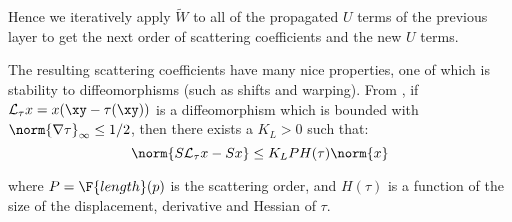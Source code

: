 Hence we iteratively apply $\tilde{W}$ to all of the propagated $U$ terms of
the previous layer to get the next order of scattering coefficients and
the new $U$ terms.

The resulting scattering coefficients have many nice properties, one of which is
stability to diffeomorphisms (such as shifts and warping). From
\cite{mallat_group_2012}, if $\mathcal{L}_\tau
x = x(\xy -\tau(\xy))$ is a diffeomorphism which is bounded with 
$\norm{\nabla \tau}_{\infty} \leq 1/2$, then there exists a $K_L > 0$ such
that:
%
\begin{equation}
  \norm{ S \mathcal{L}_{\tau}x  - S x} \leq K_L P H(\tau) \norm{x}
  \label{eq:stability}
\end{equation}

where $P = \F{length}(p)$ is the scattering order, and $H(\tau)$ is a function
of the size of the displacement, derivative and Hessian of $\tau$. 

